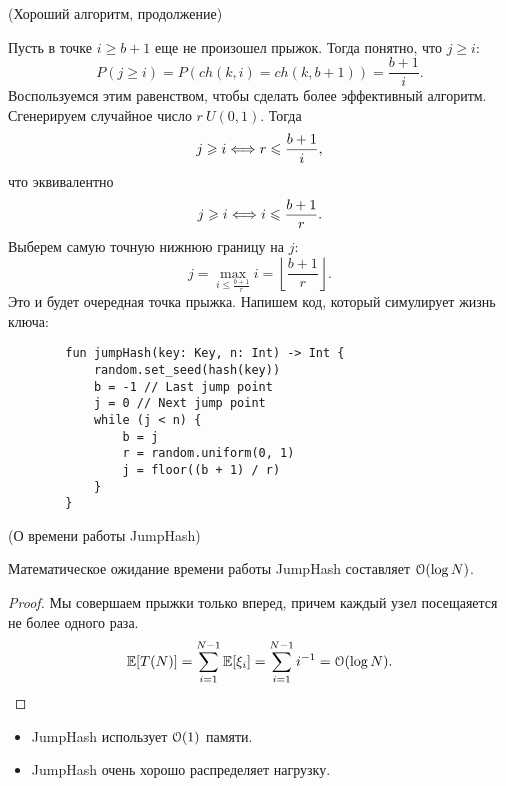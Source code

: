 \begin{algorithm}(Хороший алгоритм, продолжение)
    
    Пусть в точке $i \geqslant b + 1$ еще не произошел прыжок. Тогда понятно,
    что $j \geqslant i$:
    \[
        P(j \geqslant i) = P(ch(k, i) = ch(k, b + 1)) = \frac{b + 1}{i}
    .\]
    Воспользуемся этим равенством, чтобы сделать более эффективный алгоритм.
    Сгенерируем случайное число $r ~ U(0, 1)$. Тогда
    \[
        j \geqslant i \Longleftrightarrow r \leqslant \frac{b + 1}{i}
    ,\]
    что эквивалентно
    \[
        j \geqslant i \Longleftrightarrow i \leqslant \frac{b + 1}{r}
    .\]
    Выберем самую точную нижнюю границу на $j$:
    \[
        j = \max_{i \leqslant \frac{b + 1}{r}}{i} = \left\lfloor \frac{b + 1}{r} 
            \right\rfloor
    .\]
    Это и будет очередная точка прыжка. Напишем код, который симулирует жизнь
    ключа:
    \begin{lstlisting}
        fun jumpHash(key: Key, n: Int) -> Int {
            random.set_seed(hash(key))
            b = -1 // Last jump point
            j = 0 // Next jump point
            while (j < n) {
                b = j
                r = random.uniform(0, 1)
                j = floor((b + 1) / r)
            }
        }
    \end{lstlisting}
\end{algorithm}

\begin{lemma}(О времени работы JumpHash)

    Математическое ожидание времени работы JumpHash составляет $\mathcal{O}(\log{N})$.
\end{lemma}
\begin{proof}
    Мы совершаем прыжки только вперед, причем каждый узел посещаяется не более
    одного раза.
    \[
        \mathbb{E}[T(N)] = \sum_{i = 1}^{N - 1}{\mathbb{E}[\xi_i]} = \sum_{i = 1}^{N - 1}{i^{-1}}
        = \mathcal{O}(\log{N})
    .\]
\end{proof}

\begin{remark}
    \enewline
    \begin{itemize}
        \item JumpHash использует $\mathcal{O}(1)$ памяти.
        \item JumpHash очень хорошо распределяет нагрузку.
    \end{itemize}
\end{remark}
